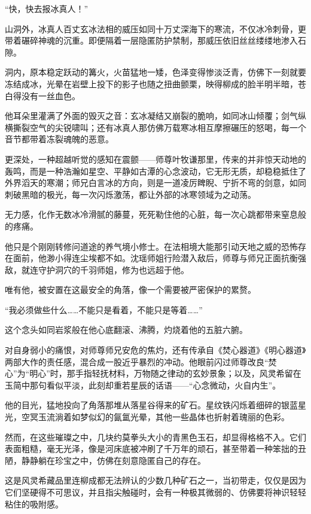 “快，快去报冰真人！”

\vspace{2em}

山洞外，冰真人百丈玄冰法相的威压如同十万丈深海下的寒流，不仅冰冷刺骨，更带着碾碎神魂的沉重。即便隔着一层隐匿防护禁制，那威压依旧丝丝缕缕地渗入石隙。

洞内，原本稳定跃动的篝火，火苗猛地一矮，色泽变得惨淡泛青，仿佛下一刻就要冻结成冰，光晕在岩壁上投下的影子也随之扭曲颤栗，映得柳成的脸半明半暗，苍白得没有一丝血色。

他耳朵里灌满了外面的毁灭之音：玄冰凝结又崩裂的脆响，如同冰山倾覆；剑气纵横撕裂空气的尖锐啸叫；还有冰真人那仿佛万载寒冰相互摩擦碾压的怒喝，每一个音节都带着冻裂魂魄的恶意。

更深处，一种超越听觉的感知在震颤——师尊叶牧谦那里，传来的并非惊天动地的轰鸣，而是一种浩瀚如星空、平静如古潭的心念波动，它无形无质，却稳稳抵住了外界滔天的寒潮；师兄白言冰的方向，则是一道凌厉睥睨、宁折不弯的剑意，如同刺破黑暗的极光，每一次闪烁激荡，都让外部的冰寒领域为之动荡。

无力感，化作无数冰冷滑腻的藤蔓，死死勒住他的心脏，每一次心跳都带来窒息般的疼痛。

他只是个刚刚转修问道途的养气境小修士。在法相境大能那引动天地之威的恐怖存在面前，他渺小得连尘埃都不如。沈瑶师姐行险潜入敌后，师尊与师兄正面抗衡强敌，就连守护洞穴的千羽师姐，修为也远超于他。

唯有他，被安置在这最安全的角落，像一个需要被严密保护的累赘。

“我必须做些什么……不能只是看着，不能只是等着……”

这个念头如同岩浆般在他心底翻滚、沸腾，灼烧着他的五脏六腑。

对自身弱小的痛恨，对师尊师兄安危的焦灼，还有传承自《焚心器道》《明心器道》两部大作的责任感，混合成一股近乎暴烈的冲动。他眼前闪过师尊改良“焚心”为“明心”时，那手指轻抚材料，万物随之律动的玄妙景象；以及，风灵希留在玉简中那句看似平淡，此刻却重若星辰的话语——“心念微动，火自内生”。

他的目光，猛地投向了角落那堆从落星谷得来的矿石。星纹铁闪烁着细碎的银蓝星光，空冥玉流淌着如梦似幻的氤氲光晕，其他一些晶体也折射着瑰丽的色彩。

然而，在这些璀璨之中，几块约莫拳头大小的青黑色玉石，却显得格格不入。它们表面粗糙，毫无光泽，像是河床底被冲刷了千万年的顽石，甚至带着一种笨拙的丑陋，静静躺在珍宝之中，仿佛在刻意隐匿自己的存在。

这是风灵希藏品里连柳成都无法辨认的少数几种矿石之一，当初带走，仅仅是因为它们坚硬得不可思议，并且指尖触碰时，会有一种极其微弱的、仿佛要将神识轻轻粘住的吸附感。

